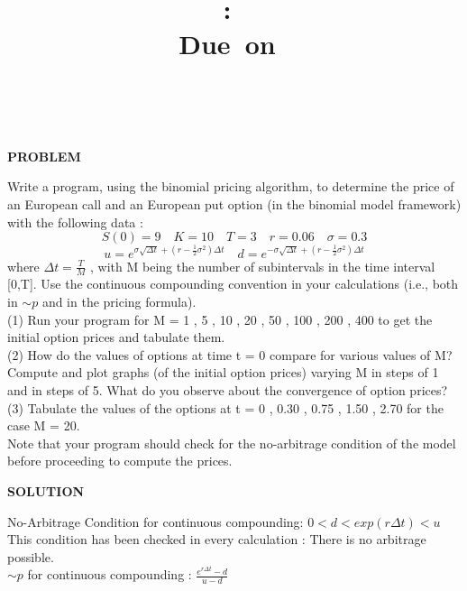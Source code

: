 \documentclass{article}
\title{
\vspace{2in}
\textmd{\textbf{\hmwkClass:\ \hmwkTitle}}\\
\normalsize\vspace{0.1in}\small{Due\ on\ \hmwkDueDate}\\
\vspace{0.1in}\large{\textit{\hmwkClassInstructor\ \hmwkClassTime}}
\vspace{3in}
}
\author{\textbf{\hmwkAuthorName}}
\date{} %
\begin{document}
\maketitle



\newpage

\begin{center}
\textbf{PROBLEM}
\end{center}
Write a program, using the binomial pricing algorithm, to determine the price of an European call and an European
put option (in the binomial model framework) with the following data :\\
$$ S(0) = 9 \quad K = 10 \quad T = 3 \quad r = 0.06 \quad \sigma = 0.3$$
$$ u = e^{\sigma \sqrt{\Delta t} + (r-\frac{1}{2}\sigma ^{2})\Delta t} \quad d = e^{-\sigma \sqrt{\Delta t} + (r-\frac{1}{2}\sigma ^{2})\Delta t}$$ where $\Delta t = \frac{T}{M}$ , with M being the number of subintervals
in the time interval [0,T]. Use the continuous compounding convention in your calculations (i.e., both in $\sim p$ and in the
pricing formula).\\
(1) Run your program for M = 1 , 5 , 10 , 20 , 50 , 100 , 200 , 400 to get the initial option prices and tabulate them.\\
(2) How do the values of options at time t = 0 compare for various values of M? Compute and plot graphs (of the
initial option prices) varying M in steps of 1 and in steps of 5. What do you observe about the convergence of
option prices?\\
(3) Tabulate the values of the options at t = 0 , 0.30 , 0.75 , 1.50 , 2.70 for the case M = 20.\\
Note that your program should check for the no-arbitrage condition of the model before proceeding to compute the
prices.\\
\begin{center}
\textbf{SOLUTION}
\end{center}
No-Arbitrage Condition for continuous compounding: $0 < d < exp(r\Delta t) < u$\\
This condition has been checked in every calculation : There is no arbitrage possible.\\ 
$\sim p$ for continuous compounding : $\frac{e^{r\Delta t} - d}{u-d}$\\
\end{document}
